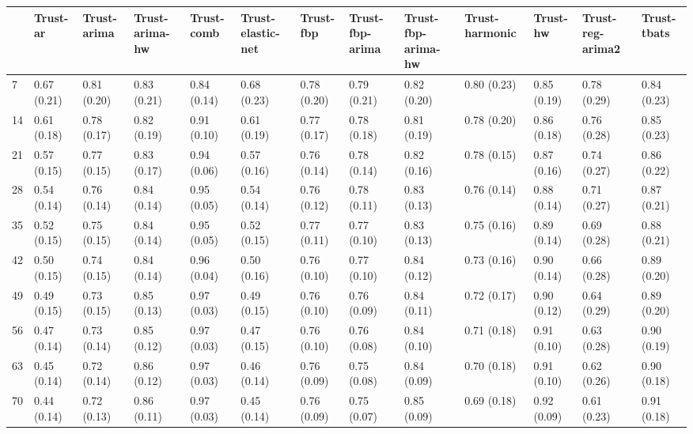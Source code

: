 \begin{tabular}{lllllllllllll}
\toprule
{} &     Trust-ar &  Trust-arima & Trust-arima-hw &   Trust-comb & Trust-elastic-net &    Trust-fbp & Trust-fbp-arima & Trust-fbp-arima-hw & Trust-harmonic &     Trust-hw & Trust-reg-arima2 &  Trust-tbats \\
\midrule
7   &  0.67 (0.21) &  0.81 (0.20) &    0.83 (0.21) &  0.84 (0.14) &       0.68 (0.23) &  0.78 (0.20) &     0.79 (0.21) &        0.82 (0.20) &    0.80 (0.23) &  0.85 (0.19) &      0.78 (0.29) &  0.84 (0.23) \\
14  &  0.61 (0.18) &  0.78 (0.17) &    0.82 (0.19) &  0.91 (0.10) &       0.61 (0.19) &  0.77 (0.17) &     0.78 (0.18) &        0.81 (0.19) &    0.78 (0.20) &  0.86 (0.18) &      0.76 (0.28) &  0.85 (0.23) \\
21  &  0.57 (0.15) &  0.77 (0.15) &    0.83 (0.17) &  0.94 (0.06) &       0.57 (0.16) &  0.76 (0.14) &     0.78 (0.14) &        0.82 (0.16) &    0.78 (0.15) &  0.87 (0.16) &      0.74 (0.27) &  0.86 (0.22) \\
28  &  0.54 (0.14) &  0.76 (0.14) &    0.84 (0.14) &  0.95 (0.05) &       0.54 (0.14) &  0.76 (0.12) &     0.78 (0.11) &        0.83 (0.13) &    0.76 (0.14) &  0.88 (0.14) &      0.71 (0.27) &  0.87 (0.21) \\
35  &  0.52 (0.15) &  0.75 (0.15) &    0.84 (0.14) &  0.95 (0.05) &       0.52 (0.15) &  0.77 (0.11) &     0.77 (0.10) &        0.83 (0.13) &    0.75 (0.16) &  0.89 (0.14) &      0.69 (0.28) &  0.88 (0.21) \\
42  &  0.50 (0.15) &  0.74 (0.15) &    0.84 (0.14) &  0.96 (0.04) &       0.50 (0.16) &  0.76 (0.10) &     0.77 (0.10) &        0.84 (0.12) &    0.73 (0.16) &  0.90 (0.14) &      0.66 (0.28) &  0.89 (0.20) \\
49  &  0.49 (0.15) &  0.73 (0.15) &    0.85 (0.13) &  0.97 (0.03) &       0.49 (0.15) &  0.76 (0.10) &     0.76 (0.09) &        0.84 (0.11) &    0.72 (0.17) &  0.90 (0.12) &      0.64 (0.29) &  0.89 (0.20) \\
56  &  0.47 (0.14) &  0.73 (0.14) &    0.85 (0.12) &  0.97 (0.03) &       0.47 (0.15) &  0.76 (0.10) &     0.76 (0.08) &        0.84 (0.10) &    0.71 (0.18) &  0.91 (0.10) &      0.63 (0.28) &  0.90 (0.19) \\
63  &  0.45 (0.14) &  0.72 (0.14) &    0.86 (0.12) &  0.97 (0.03) &       0.46 (0.14) &  0.76 (0.09) &     0.75 (0.08) &        0.84 (0.09) &    0.70 (0.18) &  0.91 (0.10) &      0.62 (0.26) &  0.90 (0.18) \\
70  &  0.44 (0.14) &  0.72 (0.13) &    0.86 (0.11) &  0.97 (0.03) &       0.45 (0.14) &  0.76 (0.09) &     0.75 (0.07) &        0.85 (0.09) &    0.69 (0.18) &  0.92 (0.09) &      0.61 (0.23) &  0.91 (0.18) \\

\end{tabular}
